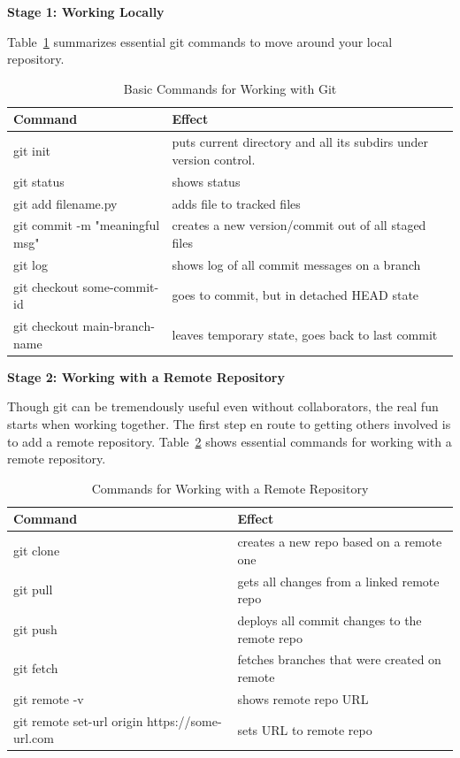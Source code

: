 \documentclass[
  12pt,
  letterpaper,
]{krantz}
\begin{document}
\textbf{Stage 1: Working Locally}

Table~\ref{tbl-gitbasics} summarizes essential git
commands to move around your local repository.

\hypertarget{tbl-gitbasics}{}
\begin{table}
\caption{\label{tbl-gitbasics}Basic Commands for Working with Git }\tabularnewline

\centering
\begin{tabular}{l>{\raggedright\arraybackslash}p{5.7cm}}
\toprule
Command & Effect\\
\midrule
git init & puts current directory and all its subdirs under version control.\\
git status & shows status\\
git add filename.py & adds file to tracked files\\
git commit -m "meaningful msg" & creates a new version/commit out of all staged files\\
git log & shows log of all commit messages on a branch\\
\addlinespace
git checkout some-commit-id & goes to commit, but in detached HEAD state\\
git checkout main-branch-name & leaves temporary state, goes back to last commit\\
\bottomrule
\end{tabular}
\end{table}

\textbf{Stage 2: Working with a Remote Repository}

Though git can be tremendously useful even without collaborators, the
real fun starts when working together. The first step en route to
getting others involved is to add a remote repository.
Table~\ref{tbl-gittable2} shows essential commands
for working with a remote repository.

\hypertarget{tbl-gittable2}{}
\begin{table}
\caption{\label{tbl-gittable2}Commands for Working with a Remote Repository }\tabularnewline

\centering
\begin{tabular}{>{\raggedright\arraybackslash}p{5.7cm}>{\raggedright\arraybackslash}p{5.7cm}}
\toprule
Command & Effect\\
\midrule
git clone & creates a new repo based on a remote one\\
git pull & gets all changes from a linked remote repo\\
git push & deploys all commit changes to the remote repo\\
git fetch & fetches branches that were created on remote\\
git remote -v & shows remote repo URL\\
\addlinespace
git remote set-url origin https://some-url.com & sets URL to remote repo\\
\bottomrule
\end{tabular}
\end{table}
\end{document}
